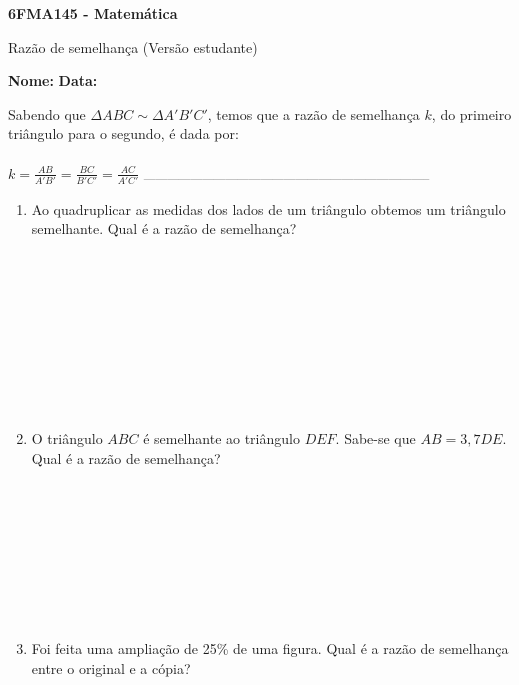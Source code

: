 \documentclass[a4paper,14pt]{article}
\begin{document}
	
	\noindent\textbf{6FMA145 - Matemática} 
	
	\begin{center}Razão de semelhança (Versão estudante)
	\end{center}
	
	\noindent\textbf{Nome:} \underline{\hspace{10cm}}
	\noindent\textbf{Data:} \underline{\hspace{4cm}}
	
	
	\begin{multicols}{2}
	    \noindent Sabendo que $\Delta$$ABC \sim \Delta$$A'B'C'$, temos que a razão de semelhança $k$, do primeiro triângulo para o segundo, é dada por: \\\\
	    $k = \frac{AB}{A'B'} = \frac{BC}{B'C'} = \frac{AC}{A'C'}$
		\noindent\textsubscript{--------------------------------------------------------------------------}
		\begin{enumerate} 
			\item Ao quadruplicar as medidas dos lados de um triângulo obtemos um triângulo semelhante. Qual é a razão de semelhança? \\\\\\\\\\\\\\\\\\\\
			\item O triângulo $ABC$ é semelhante ao triângulo $DEF$. Sabe-se que $AB = 3,7DE$. Qual é a razão de semelhança? \\\\\\\\\\\\\\\\\\
			\item Foi feita uma ampliação de 25\% de uma figura. Qual é a razão de semelhança entre o original e a cópia? \\\\\\\\\\\\\\\\\\\\

\end{enumerate}
\end{multicols}
\end{document}
